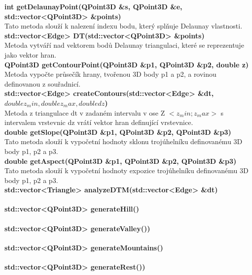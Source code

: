 \documentclass[a4paper, 12pt]{article}
\begin{document}
\textbf{int getDelaunayPoint(QPoint3D \&s, QPoint3D \&e, std::vector<QPoint3D> \&points)}\\
Tato metoda slouží k nalezení indexu bodu, který splňuje Delaunay vlastnosti.\\

\textbf{std::vector<Edge> DT(std::vector<QPoint3D> \&points)}\\
Metoda vytváří nad vektorem bodů Delaunay triangulaci, které se reprezentuje jako vektor hran.\\

\textbf{QPoint3D getContourPoint(QPoint3D \&p1, QPoint3D \&p2, double z)}\\
Metoda vypočte průsečík hrany, tvořenou 3D body p1 a p2, a rovinou definovanou z souřadnicí.\\

\textbf{std::vector<Edge> createContours(std::vector<Edge> \&dt, $double z_min, double z_max, double dz$)}\\
Metoda z triangulace dt v zadaném intervalu v ose Z $<z_min ; z_max>$ s intervalem vrstevnic dz vrátí vektor hran definující vrstevnice.\\

\textbf{double getSlope(QPoint3D \&p1, QPoint3D \&p2, QPoint3D \&p3)}\\
Tato metoda slouží k vypočetní hodnoty sklonu trojúhelníku definovanému 3D body p1, p2 a p3.\\

\textbf{double getAspect(QPoint3D \&p1, QPoint3D \&p2, QPoint3D \&p3)}\\
Tato metoda slouží k vypočetní hodnoty expozice trojúhelníku definovanému 3D body p1, p2 a p3.\\

\textbf{std::vector<Triangle> analyzeDTM(std::vector<Edge> \&dt)}\\
\\

\textbf{std::vector<QPoint3D> generateHill()}\\
\\

\textbf{std::vector<QPoint3D> generateValley())}\\
\\

\textbf{std::vector<QPoint3D> generateMountains()}\\
\\

\textbf{std::vector<QPoint3D> generateRest())}\\
\\
\end{document}
